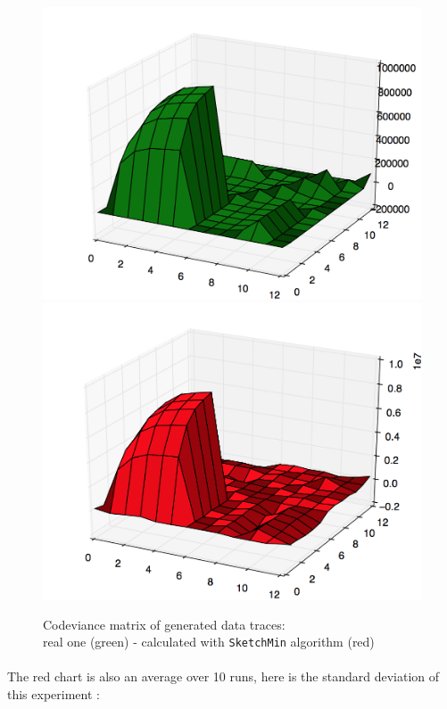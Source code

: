 \documentclass[a4paper]{article}%
\begin{document}
\begin{figure}[H]
	\centering
	\includegraphics[scale=0.22]{generated10times_real.png}
	\includegraphics[scale=0.22]{generated10times_sketchmin.png}
	\caption{\footnotesize Codeviance matrix of generated data traces:\\real one (green) - calculated with \texttt{SketchMin} algorithm (red)}
	\label{ref:exp_artificial}
\end{figure}

\paragraph{}The red chart is also an average over 10 runs, here is the standard deviation of this experiment :
\end{document}
